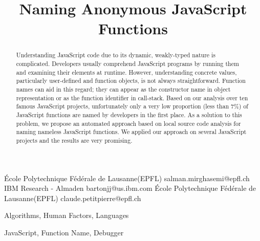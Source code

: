 \documentclass[10pt, preprint]{sigplanconf}
\begin{document}
\copyrightdata{[to be supplied]} 


\title{Naming Anonymous JavaScript Functions}

           {\'Ecole Polytechnique F\'ed\'erale de Lausanne(EPFL)}
           {salman.mirghasemi@epfl.ch}
           {IBM Research - Almaden}
           {bartonjj@us.ibm.com}
           {\'Ecole Polytechnique F\'ed\'erale de Lausanne(EPFL)}
           {claude.petitpierre@epfl.ch}

\maketitle

\begin{abstract}
Understanding JavaScript code due to its dynamic, weakly-typed nature is complicated. Developers usually comprehend JavaScript programs by running them and examining their elements at runtime. However, understanding concrete values, particularly user-defined and function objects, is not always straightforward. Function names can aid in this regard; they can appear as the constructor name in object representation or as the function identifier in call-stack. Based on our analysis over ten famous JavaScript projects, unfortunately only a very low proportion (less than 7\%) of JavaScript functions are named by developers in the first place. As a solution to this problem, we propose an automated approach based on local source code analysis for naming nameless JavaScript functions. We applied our approach on several JavaScript projects and the results are very promising.
\end{abstract}


\terms
Algorithms, Human Factors, Languages

\keywords
JavaScript, Function Name, Debugger
\end{document}
